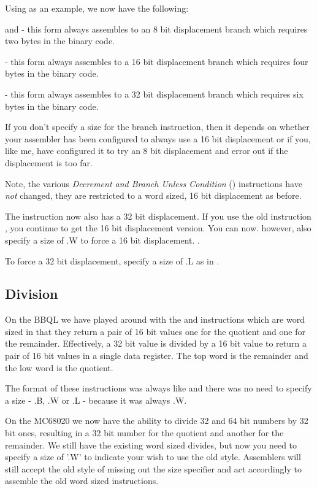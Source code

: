 Using  as an example, we now have the following:

 and  - this form always assembles to an 8 bit displacement branch which requires two bytes in the binary code.

 - this form always assembles to a 16 bit displacement branch which requires four bytes in the binary code.

 - this form always assembles to a 32 bit displacement branch which requires six bytes in the binary code.

If you don't specify a size for the branch instruction, then it depends on whether your assembler has been configured to always use a 16 bit displacement or if you, like me, have configured it to try an 8 bit displacement and error out if the displacement is too far.

Note, the various \emph{Decrement and Branch Unless Condition} () instructions have \emph{not} changed, they are restricted to a word sized, 16 bit displacement as before.

The  instruction now also has a 32 bit displacement. If you use the old instruction , you continue to get the 16 bit displacement version. You can now. however, also specify a size of .W to force a 16 bit displacement. .

To force a 32 bit displacement, specify a size of .L as in .

\subsection{Division}

On the BBQL we have played around with the  and  instructions which are word sized in that they return a pair of 16 bit values one for the quotient and one for the remainder. Effectively, a 32 bit value is divided by a 16 bit value to return a pair of 16 bit values in a single data register. The top word is the remainder and the low word is the quotient.

The format of these instructions was always like  and there was no need to specify a size - .B, .W or .L - because it was always .W.

On the MC68020 we now have the ability to divide 32 and 64 bit numbers by 32 bit ones, resulting in a 32 bit number for the quotient and another for the remainder. We still have the existing word sized divides, but now you need to specify a size of '.W' to indicate your wish to use the old style. Assemblers will still accept the old style of missing out the size specifier and act accordingly to assemble the old word sized instructions.

